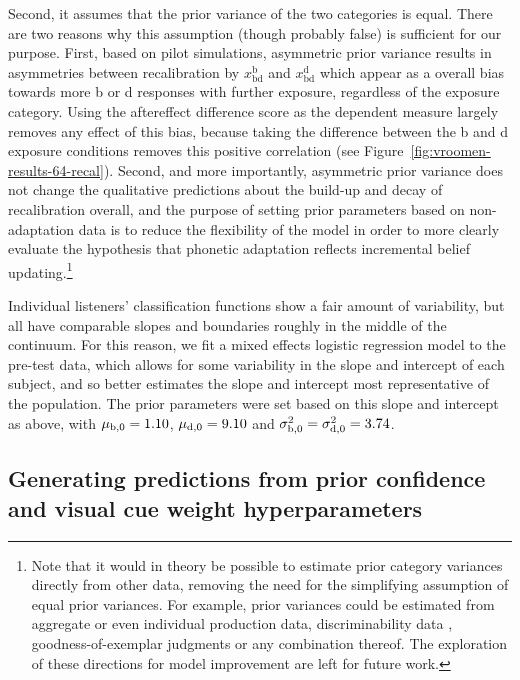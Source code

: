 Second, it assumes that the prior variance of the two categories is equal.
There are two reasons why this assumption (though probably false) is sufficient for our purpose.
First, based on pilot simulations, asymmetric prior variance results in asymmetries between recalibration by $x_\mathrm{bd}^\mathrm{b}$ and $x_\mathrm{bd}^\mathrm{d}$ which appear as a overall bias towards more \ph b or \ph d responses with further exposure, regardless of the exposure category.  Using the aftereffect difference score as the dependent measure largely removes any effect of this bias, because taking the difference between the \ph b and \ph d exposure conditions removes this positive correlation (see Figure~\ref{fig:vroomen-results-64-recal}).  Second, and more importantly, asymmetric prior variance does not change the qualitative predictions about the build-up and decay of recalibration overall, and the purpose of setting prior parameters based on non-adaptation data is to reduce the flexibility of the model in order to more clearly evaluate the hypothesis that phonetic adaptation reflects incremental belief updating.\footnote{Note that it would in theory be possible to estimate prior category variances directly from other data, removing the need for the simplifying assumption of equal prior variances. For example, prior variances could be estimated from aggregate or even individual production data, discriminability data \autocite{Kronrod2012}, goodness-of-exemplar judgments \autocite{Pisoni1974,Andruski1994} or any combination thereof. The exploration of these directions for model improvement are left for future work.}

Individual listeners' classification functions show a fair amount of variability, but all have comparable slopes and boundaries roughly in the middle of the continuum.  For this reason, we fit a mixed effects logistic regression model \autocite{Jaeger2008} to the pre-test data, which allows for some variability in the slope and intercept of each subject, and so better estimates the slope and intercept most representative of the population.  The prior parameters were set based on this slope and intercept as above, with $\mu_{\mathrm{b},0}=\num{1.10}$, $\mu_{\mathrm{d},0}=\num{9.10}$ and $\sigma^2_{\mathrm{b},0}=\sigma^2_{\mathrm{d},0} = \num{3.74}$.

\subsection{Generating predictions from prior confidence and visual cue weight hyperparameters}
\label{sec:prior-conf-pseud}

